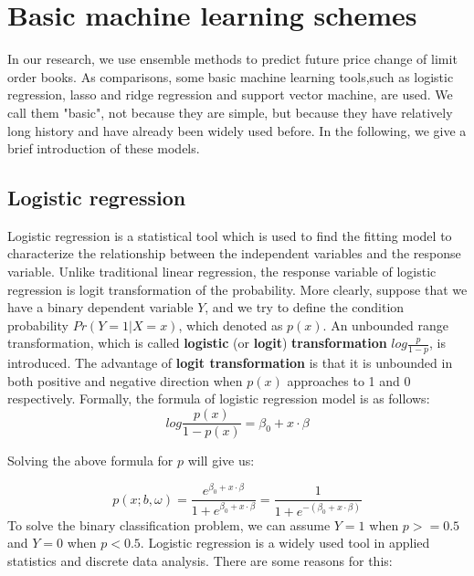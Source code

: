 \chapter{Basic machine learning schemes}
In our research, we use ensemble methods to predict future price change of limit order books. As comparisons, some basic machine learning tools,such as logistic regression, lasso and ridge regression and support vector machine,  are used. We call them "basic", not because they are simple, but because they have relatively long history and have already been widely used before. In the following, we give a brief introduction of these models.


\section{Logistic regression}
Logistic regression is a statistical tool which is used to find the fitting model to characterize the relationship between the independent variables and the response variable. Unlike traditional linear regression, the response variable of logistic regression is logit transformation of the probability. More clearly, suppose that we have a binary dependent variable $Y$, and we try to define the condition probability $Pr(Y=1|X=x)$, which denoted as $p(x)$. An unbounded range transformation, which is called \textbf{logistic} (or \textbf{logit}) \textbf{transformation} $log\frac{p}{1-p}$, is introduced. The advantage of \textbf{logit transformation} is that it is unbounded in both positive and negative direction when $p(x)$ approaches to 1 and 0 respectively. Formally, the formula of logistic regression model is as follows:\\
\begin{equation}\label{eq:logit}
log\frac{p(x)}{1-p(x)}=\beta_0+x\cdot \beta
\end{equation}      

Solving the above formula for $p$ will give us:


\begin{equation}\label{eq:logit_p}
p(x;b,\omega)=\frac{e^{\beta_0+x\cdot\beta}}{1+e^{\beta_0+x\cdot\beta}}=\frac{1}{1+e^{-(\beta_0+x\cdot\beta)}}
\end{equation}      
To solve the binary classification problem, we can assume $Y=1$ when $p>=0.5$ and $Y=0$ when $p<0.5$. Logistic regression is a widely used tool in applied statistics and discrete data analysis. There are some reasons for this:

